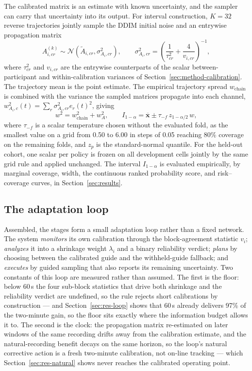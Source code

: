 The calibrated matrix is an estimate with known uncertainty, and the sampler can carry that uncertainty into its output. For interval construction, $K=32$ reverse trajectories jointly sample the DDIM initial noise and an entrywise propagation matrix
\begin{equation}
  A^{(k)}_{i,cr}\sim
  \mathcal{N}\!\left(\widetilde A_{i,cr},\sigma^2_{A_i,cr}\right),
  \qquad
  \sigma^2_{A_i,cr}=\left(\frac{1}{\tau^2_{cr}}+\frac{4}{v_{i,cr}}\right)^{-1},
  \label{eq:operator-sample}
\end{equation}
where $\tau^2_{cr}$ and $v_{i,cr}$ are the entrywise counterparts of the scalar between-participant and within-calibration variances of Section~\ref{sec:method-calibration}. The trajectory mean is the point estimate. The empirical trajectory spread $w_{\mathrm{chain}}$ is combined with the variance the sampled matrices propagate into each channel, $w^2_{A_i,c}(t)=\sum_{r}\sigma^2_{A_i,cr}e_r(t)^2$, giving
\begin{equation}
  w^2=w_{\mathrm{chain}}^2+w_A^2,
  \qquad
  I_{1-\alpha}=\overline{\mathbf{x}}
  \mathbin{\pm} \tau_{-f}\,z_{1-\alpha/2}\,w,
  \label{eq:interval}
\end{equation}
where $\tau_{-f}$ is a scalar temperature chosen without the evaluated fold, as the smallest value on a grid from 0.50 to 6.00 in steps of 0.05 reaching 80\% coverage on the remaining folds, and $z_p$ is the standard-normal quantile. For the held-out cohort, one scalar per policy is frozen on all development cells jointly by the same grid rule and applied unchanged. The interval $I_{1-\alpha}$ is evaluated empirically, by marginal coverage, width, the continuous ranked probability score, and risk--coverage curves, in Section~\ref{sec:results}.

\subsection{The adaptation loop}
\label{sec:method-loop}

Assembled, the stages form a small adaptation loop rather than a fixed network. The system \emph{monitors} its own calibration through the block-agreement statistic $v_i$; \emph{analyzes} it into a shrinkage weight $\lambda_i$ and a binary reliability verdict; \emph{plans} by choosing between the calibrated guide and the withheld-guide fallback; and \emph{executes} by guided sampling that also reports its remaining uncertainty. Two constants of this loop are measured rather than assumed. The first is the floor: below 60\,s the four sub-block statistics that drive both shrinkage and the reliability verdict are undefined, so the rule rejects short calibrations by construction --- and Section~\ref{sec:res-loop} shows that 60\,s already delivers 97\% of the two-minute gain, so the floor sits exactly where the information budget allows it to. The second is the clock: the propagation matrix re-estimated on later windows of the same recording drifts away from the calibration estimate, and the natural-recording benefit decays on the same horizon, so the loop's natural corrective action is a fresh two-minute calibration, not on-line tracking --- which Section~\ref{sec:res-natural} shows never reaches the calibrated operating point.
